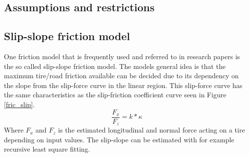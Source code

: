 \subsection{Assumptions and restrictions}



\subsection{Slip-slope friction model}

One friction model that is frequently used and referred to in research papers is the so called slip-slope friction model. The models general idea is that the maximum tire/road friction available can be decided due to its dependency on the slope from the slip-force curve in the linear region. This slip-force curve has the same characteristics as the slip-friction coefficient curve seen in Figure \ref{fric_slip}. 
\begin{equation}
	\dfrac{F_{x}}{F_{z}} = k*\kappa
\end{equation}
Where $ F_{x} $ and $ F_{z} $ is the estimated longitudinal and normal force acting on a tire depending on input values. The slip-slope can be estimated with for example recursive least square fitting. 
